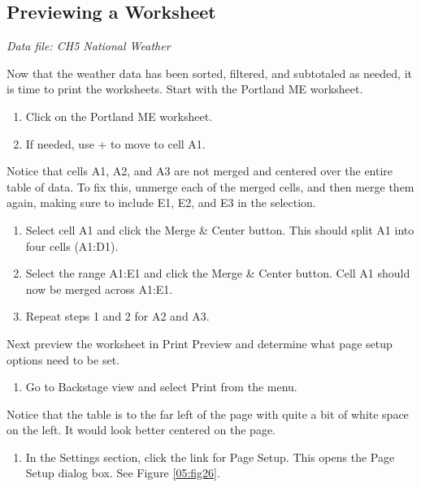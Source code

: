 \subsection{Previewing a Worksheet}

\textit{Data file: CH5 National Weather}

Now that the weather data has been sorted, filtered, and subtotaled as needed, it is time to print the worksheets. Start with the Portland ME worksheet.

\begin{enumerate}
	\item Click on the Portland ME worksheet. 
	\item If needed, use + to move to cell A1.
\end{enumerate}

Notice that cells A1, A2, and A3 are not merged and centered over the entire table of data. To fix this, unmerge each of the merged cells, and then merge them again, making sure to include E1, E2, and E3 in the selection.

\begin{enumerate}
	\item Select cell A1 and click the Merge \& Center button. This should split A1 into four cells (A1:D1).
	\item Select the range A1:E1 and click the Merge \& Center button. Cell A1 should now be merged across A1:E1.
	\item Repeat steps 1 and 2 for A2 and A3.
\end{enumerate}

Next preview the worksheet in Print Preview and determine what page setup options need to be set.

\begin{enumerate}
	\item Go to Backstage view and select Print from the menu.
\end{enumerate}

Notice that the table is to the far left of the page with quite a bit of white space on the left. It would look better centered on the page.

\begin{enumerate}
	\item In the Settings section, click the link for Page Setup. This opens the Page Setup dialog box. See Figure \ref{05:fig26}.
\end{enumerate}

